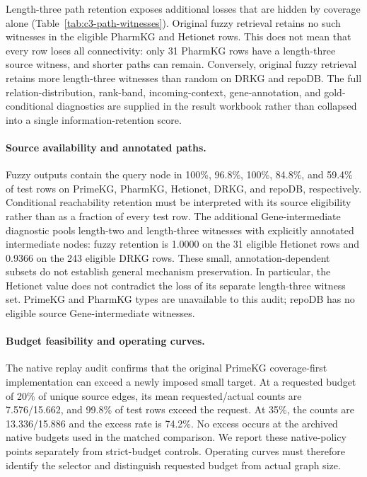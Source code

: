 Length-three path retention exposes additional losses that are hidden by
coverage alone (Table~\ref{tab:c3-path-witnesses}). Original fuzzy retrieval
retains no such witnesses in the eligible PharmKG and Hetionet rows. This does
not mean that every row loses all connectivity: only 31 PharmKG rows have a
length-three source witness, and shorter paths can remain. Conversely,
original fuzzy retrieval retains more length-three witnesses than random on
DRKG and repoDB. The full relation-distribution, rank-band, incoming-context,
gene-annotation, and gold-conditional diagnostics are supplied in the result
workbook rather than collapsed into a single information-retention score.

\paragraph{Source availability and annotated paths.}
Fuzzy outputs contain the query node in 100\%, 96.8\%, 100\%, 84.8\%, and
59.4\% of test rows on PrimeKG, PharmKG, Hetionet, DRKG, and repoDB,
respectively. Conditional reachability retention must be interpreted with its
source eligibility rather than as a fraction of every test row. The additional
Gene-intermediate diagnostic pools length-two and length-three witnesses with
explicitly annotated intermediate nodes: fuzzy retention is 1.0000 on the
31 eligible Hetionet rows and 0.9366 on the 243 eligible DRKG rows. These small,
annotation-dependent subsets do not establish general mechanism preservation.
In particular, the Hetionet value does not contradict the loss of its separate
length-three witness set. PrimeKG and PharmKG types are unavailable to this
audit; repoDB has no eligible source Gene-intermediate witnesses.

\paragraph{Budget feasibility and operating curves.}
The native replay audit confirms that the original PrimeKG coverage-first
implementation can exceed a newly imposed small target. At a requested budget
of 20\% of unique source edges, its mean requested/actual counts are
7.576/15.662, and 99.8\% of test rows exceed the request. At 35\%, the counts are
13.336/15.886 and the excess rate is 74.2\%. No excess occurs at the archived
native budgets used in the matched comparison. We report these native-policy
points separately from strict-budget controls. Operating curves must therefore
identify the selector and distinguish requested budget from actual graph size.

